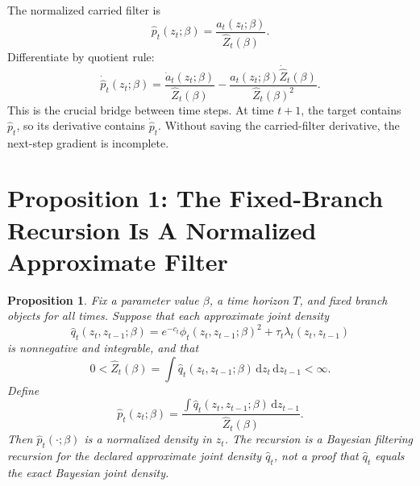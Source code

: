 \documentclass[11pt]{article}
\newtheorem{proposition}{Proposition}
\newcommand{\dd}{\,\mathrm d}
\begin{document}
The normalized carried filter is
\[
    \widehat p_t(z_t;\beta)
    =
    \frac{a_t(z_t;\beta)}{\widehat Z_t(\beta)}.
    \tag{P19-75}
\]
Differentiate by quotient rule:
\[
    \dot{\widehat p}_t(z_t;\beta)
    =
    \frac{\dot a_t(z_t;\beta)}{\widehat Z_t(\beta)}
    -
    \frac{a_t(z_t;\beta)\dot{\widehat Z}_t(\beta)}
    {\widehat Z_t(\beta)^2}.
    \tag{P19-76}
\]
This is the crucial bridge between time steps.  At time \(t+1\), the target
contains \(\widehat p_t\), so its derivative contains
\(\dot{\widehat p}_t\).  Without saving the carried-filter derivative, the
next-step gradient is incomplete.

\section{Proposition 1: The Fixed-Branch Recursion Is A Normalized Approximate Filter}

\begin{proposition}
Fix a parameter value \(\beta\), a time horizon \(T\), and fixed branch objects
for all times.  Suppose that each approximate joint density
\[
    \widehat q_t(z_t,z_{t-1};\beta)
    =
    e^{-c_t}\phi_t(z_t,z_{t-1};\beta)^2
    +
    \tau_t\lambda_t(z_t,z_{t-1})
    \tag{P19-77}
\]
is nonnegative and integrable, and that
\[
    0<\widehat Z_t(\beta)
    =
    \int \widehat q_t(z_t,z_{t-1};\beta)\dd z_t\dd z_{t-1}
    <\infty.
    \tag{P19-78}
\]
Define
\[
    \widehat p_t(z_t;\beta)
    =
    \frac{\int \widehat q_t(z_t,z_{t-1};\beta)\dd z_{t-1}}
    {\widehat Z_t(\beta)}.
    \tag{P19-79}
\]
Then \(\widehat p_t(\cdot;\beta)\) is a normalized density in \(z_t\).  The
recursion is a Bayesian filtering recursion for the declared approximate joint
density \(\widehat q_t\), not a proof that \(\widehat q_t\) equals the exact
Bayesian joint density.
\end{proposition}
\end{document}
